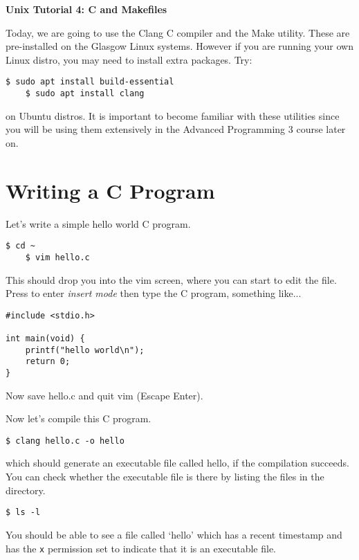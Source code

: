 \documentclass{article}
\begin{document}
\noindent
{\Large \textsf{\textbf{Unix Tutorial 4: C and Makefiles}}}

\bigskip


Today, we are going to use the Clang C compiler and the Make utility. These are pre-installed on the Glasgow Linux systems. However if you are running your own Linux distro, you may need to install extra packages. Try:
\begin{lstlisting}[style=BashInputStyle]
    $ sudo apt install build-essential
    $ sudo apt install clang
\end{lstlisting}
on Ubuntu distros.
It is important to become familiar with these utilities since you will be using them extensively in the Advanced Programming 3 course later on.

\section*{Writing a C Program}

Let's write a simple hello world C program.

\begin{lstlisting}[style=BashInputStyle]
    $ cd ~
    $ vim hello.c
\end{lstlisting}

This should drop you into the vim screen, where you can start to edit the file. Press  to enter \textit{insert mode} then type the C program, something like...

\begin{lstlisting}[style=CeeProg]
#include <stdio.h>

int main(void) {
    printf("hello world\n");
    return 0;
}
\end{lstlisting}

Now save hello.c and quit vim (Escape \keys{:}   Enter).

Now let's compile this C program. 
\begin{lstlisting}[style=BashInputStyle]
    $ clang hello.c -o hello
\end{lstlisting}
which should generate an executable file called hello, if the compilation succeeds.
You can check whether the executable file is there by listing the files in the directory.
\begin{lstlisting}[style=BashInputStyle]
    $ ls -l 
\end{lstlisting}
You should be able to see a file called `hello' which has a recent timestamp and has the \texttt{x} permission set to indicate that it is an executable file.
\end{document}
